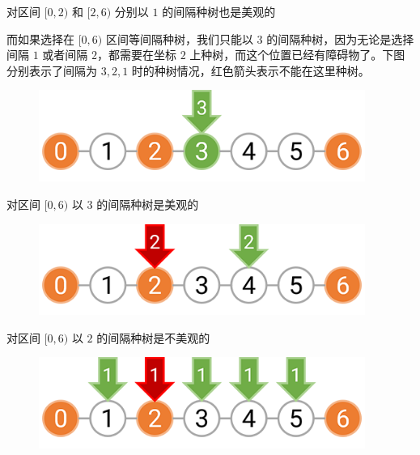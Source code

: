 对区间 $[0, 2)$ 和 $[2, 6)$ 分别以 $1$ 的间隔种树也是美观的

而如果选择在 $[0, 6)$ 区间等间隔种树，我们只能以 $3$ 的间隔种树，因为无论是选择间隔 $1$ 或者间隔 $2$，都需要在坐标 $2$ 上种树，而这个位置已经有障碍物了。下图分别表示了间隔为 $3, 2, 1$ 时的种树情况，红色箭头表示不能在这里种树。

\begin{figure}[H]
    \centering
    \includegraphics[width=0.95\textwidth]{image/22/4-p-3.png}
\end{figure}

对区间 $[0, 6)$ 以 $3$ 的间隔种树是美观的

\begin{figure}[H]
    \centering
    \includegraphics[width=0.95\textwidth]{image/22/4-p-4.png}
\end{figure}

对区间 $[0, 6)$ 以 $2$ 的间隔种树是不美观的

\begin{figure}[H]
    \centering
    \includegraphics[width=0.95\textwidth]{image/22/4-p-5.png}
\end{figure}

